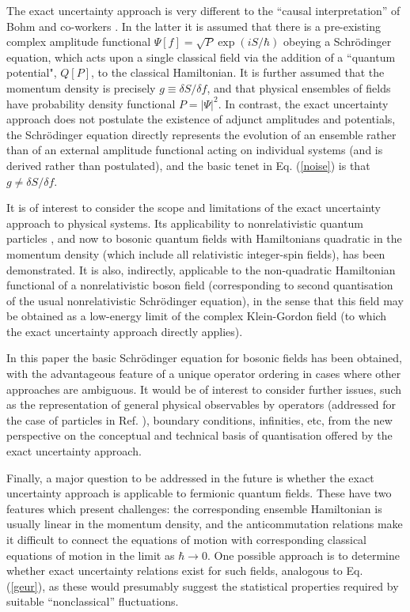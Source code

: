 \documentclass[a4paper,preprint, showpacs, aps, draft]{revtex4}
\begin{document}
{{The exact uncertainty approach is very different to
the ``causal interpretation'' of Bohm and co-workers \cite{holland}.
In the latter it is assumed that there is a pre-existing complex
amplitude functional $\Psi[f]=\sqrt{P}\exp(iS/\hbar)$ 
obeying a Schr\"{o}dinger equation, 
which acts upon a single classical field  via
the addition of a ``quantum potential", $Q[P]$, to the classical Hamiltonian.
It is further assumed that the momentum density is precisely 
$g\equiv\delta S/\delta f$, and that physical ensembles of fields have 
probability density functional $P=|\Psi|^2$.
In contrast, the exact
uncertainty approach does not postulate the existence of adjunct
amplitudes and potentials, the Schr\"{o}dinger equation 
directly represents the evolution of an ensemble rather than of an 
external amplitude functional acting on individual systems 
(and is derived rather than postulated), 
and the basic tenet in Eq. (\ref{noise}) 
is that $g\neq\delta S/\delta f$.

It is of interest to consider the scope and limitations of the exact
uncertainty approach to physical systems.  Its applicability to
nonrelativistic quantum particles \cite{hallreg, bamberg, note}, and now
to bosonic quantum fields with Hamiltonians quadratic in the momentum
density (which include all relativistic integer-spin fields), 
has been demonstrated. 
It is also, indirectly, applicable
to the non-quadratic Hamiltonian functional
of a nonrelativistic boson field (corresponding to second quantisation
of the
usual nonrelativistic Schr\"{o}dinger equation), in the sense that this
field may be obtained as a low-energy limit of the complex Klein-Gordon
field
\cite{brown} (to which the exact uncertainty approach directly applies).

In this paper the basic Schr\"{o}dinger equation for bosonic fields
has been obtained, with the advantageous feature of a
unique operator ordering in cases where other approaches are ambiguous.   
It would be of interest to consider further issues, such as the
representation of general physical observables by operators 
(addressed for the case of particles in Ref. \cite{hallreg}), boundary
conditions, infinities, etc, from the new perspective on the conceptual
and technical basis of
quantisation offered by the exact uncertainty approach.

Finally, a major question to be addressed in the future is whether the exact
uncertainty approach is applicable to fermionic quantum fields. These have
two features which present challenges: the corresponding
ensemble Hamiltonian is usually linear in the momentum density, and the
anticommutation relations make it difficult to connect the equations of
motion with corresponding classical equations of motion in the limit as
$\hbar\rightarrow 0$.  One possible approach is to determine whether
exact uncertainty relations exist for such fields, analogous to Eq.
(\ref{geur}), as these would presumably suggest the statistical
properties required by suitable ``nonclassical'' fluctuations.

}}
\end{document}
